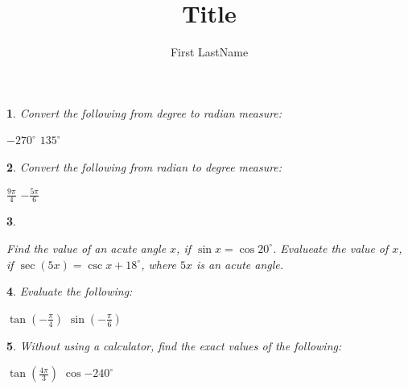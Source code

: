 \documentclass{article}
\title{Title}
\author{First LastName}
\newtheorem{question}{}
\begin{document}
\begin{question}
    Convert the following from degree to radian measure:
    \begin{tasks}
        \task $-270^{\circ}$
        \vspace{7 cm}
        \task $135^{\circ}$
        \vspace{7 cm}
    \end{tasks}
\end{question}

\begin{question}
    Convert the following from radian to degree measure:
    \begin{tasks}
        \task $\frac{9\pi}{4}$
        \vspace{7 cm}
        \task $-\frac{5\pi}{6}$
        \vspace{7 cm}
    \end{tasks}
\end{question}

\begin{question}
    \begin{tasks}
        \task Find the value of an acute angle $x$, if $\sin{x} = \cos{20^{\circ}}$.
        \vspace{7 cm}
        \task Evalueate the value of $x$, if $\sec(5x) = \csc{x + 18^{\circ}}$, where $5x$ is an acute angle.
        \vspace{7 cm}
    \end{tasks}
\end{question}

\begin{question}
    Evaluate the following:
    \begin{tasks}
        \task $\tan{(-\frac{\pi}{4})}$
        \vspace{7 cm}
        \task $\sin{(-\frac{\pi}{6})}$
        \vspace{7 cm}
    \end{tasks}
\end{question}

\begin{question}
    Without using a calculator, find the exact values of the following:
    \begin{tasks}
        \task $\tan{(\frac{4\pi}{3})}$
        \vspace{7 cm}
        \task $\cos{-240^{\circ}}$
        \vspace{7 cm}
    \end{tasks}
\end{question}
\end{document}
